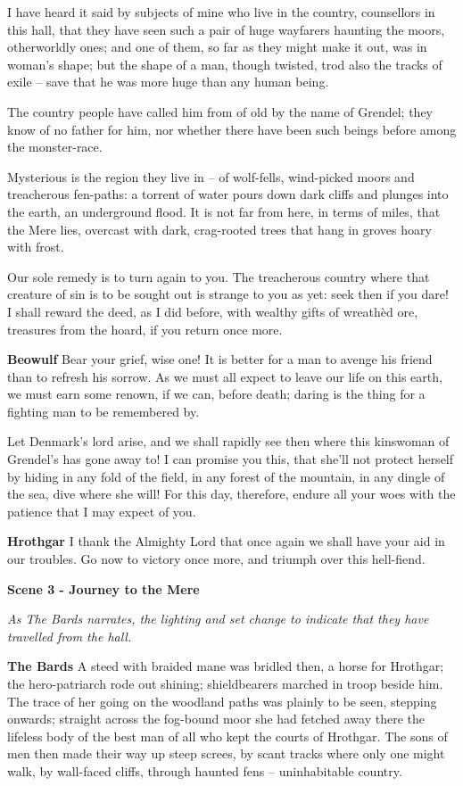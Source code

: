 \documentclass[a4paper]{article}
\begin{document}
{I have heard it said by subjects of mine
who live in the country, counsellors in this hall,
that they have seen such a pair
of huge wayfarers haunting the moors,
otherworldly ones; and one of them,
so far as they might make it out,
was in woman’s shape; but the shape of a man,
though twisted, trod also the tracks of exile
– save that he was more huge than any human being.

The country people have called him from of old
by the name of Grendel; they know of no father for him,
nor whether there have been such beings before
among the monster-race.

Mysterious is the region
they live in – of wolf-fells, wind-picked moors
and treacherous fen-paths: a torrent of water
pours down dark cliffs and plunges into the earth,
an underground flood. It is not far from here,
in terms of miles, that the Mere lies,
overcast with dark, crag-rooted trees
that hang in groves hoary with frost.

Our sole remedy
is to turn again to you. The treacherous country
where that creature of sin is to be sought out
is strange to you as yet: seek then if you dare!
I shall reward the deed, as I did before,
with wealthy gifts of wreathèd ore,
treasures from the hoard, if you return once more.

\textbf{Beowulf} Bear your grief, wise one! It is better for a man
to avenge his friend than to refresh his sorrow.
As we must all expect to leave
our life on this earth, we must earn some renown,
if we can, before death; daring is the thing
for a fighting man to be remembered by.

Let Denmark’s lord arise, and we shall rapidly see then
where this kinswoman of Grendel’s has gone away to!
I can promise you this, that she’ll not protect herself by hiding
in any fold of the field, in any forest of the mountain,
in any dingle of the sea, dive where she will!
For this day, therefore, endure all your woes
with the patience that I may expect of you.

\textbf{Hrothgar} I thank the Almighty Lord
that once again we shall have your aid in our troubles. 
Go now to victory once more,
and triumph over this hell-fiend.

\centerline{\textbf{Scene 3 - Journey to the Mere}}
\centerline{\textit{As The Bards narrates, the lighting and set change to indicate that they have travelled from the hall.}}

\textbf{The Bards} A steed with braided mane was bridled then,
a horse for Hrothgar; the hero-patriarch
rode out shining; shieldbearers marched
in troop beside him. The trace of her going
on the woodland paths was plainly to be seen,
stepping onwards; straight across
the fog-bound moor she had fetched away there
the lifeless body of the best man
of all who kept the courts of Hrothgar.
The sons of men then made their way
up steep screes, by scant tracks
where only one might walk, by wall-faced cliffs,
through haunted fens – uninhabitable country.

}
\end{document}
